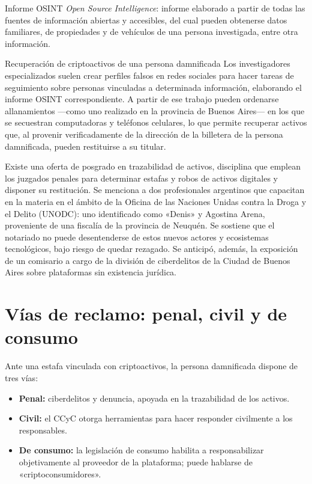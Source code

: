 \documentclass[12pt,oneside]{book}
\begin{document}
\begin{definition}{Informe OSINT}
\emph{Open Source Intelligence}: informe elaborado a partir de todas las fuentes de información abiertas y accesibles, del cual pueden obtenerse datos familiares, de propiedades y de vehículos de una persona investigada, entre otra información.
\end{definition}

\begin{example}{Recuperación de criptoactivos de una persona damnificada}
Los investigadores especializados suelen crear perfiles falsos en redes sociales para hacer tareas de seguimiento sobre personas vinculadas a determinada información, elaborando el informe OSINT correspondiente. A partir de ese trabajo pueden ordenarse allanamientos ---como uno realizado en la provincia de Buenos Aires--- en los que se secuestran computadoras y teléfonos celulares, lo que permite recuperar activos que, al provenir verificadamente de la dirección de la billetera de la persona damnificada, pueden restituirse a su titular.
\end{example}

Existe una oferta de posgrado en trazabilidad de activos, disciplina que emplean los juzgados penales para determinar estafas y robos de activos digitales y disponer su restitución. Se menciona a dos profesionales argentinos que capacitan en la materia en el ámbito de la Oficina de las Naciones Unidas contra la Droga y el Delito (UNODC): uno identificado como «Denis» y Agostina Arena, proveniente de una fiscalía de la provincia de Neuquén.
Se sostiene que el notariado no puede desentenderse de estos nuevos actores y ecosistemas tecnológicos, bajo riesgo de quedar rezagado. Se anticipó, además, la exposición de un comisario a cargo de la división de ciberdelitos de la Ciudad de Buenos Aires sobre plataformas sin existencia jurídica.

\section{Vías de reclamo: penal, civil y de consumo}

Ante una estafa vinculada con criptoactivos, la persona damnificada dispone de tres vías:

\begin{itemize}
    \item \textbf{Penal:} ciberdelitos y denuncia, apoyada en la trazabilidad de los activos.
    \item \textbf{Civil:} el CCyC otorga herramientas para hacer responder civilmente a los responsables.
    \item \textbf{De consumo:} la legislación de consumo habilita a responsabilizar objetivamente al proveedor de la plataforma; puede hablarse de «criptoconsumidores».
\end{itemize}
\end{document}
